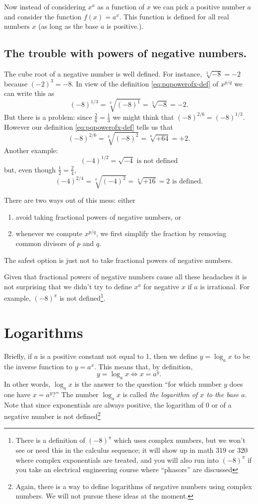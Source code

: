 Now instead of considering $x^a$ as a function of $x$ we can pick a positive
number $a$ and consider the function $f(x) = a^x$. This function is defined for
all real numbers $x$ (as long as the base $a$ is positive.).




\subsection{The trouble with powers of negative numbers. } %
The cube root of a negative number is well defined.  For instance,
$\sqrt[3]{-8}=-2$ because $(-2)^3 = -8$.  In view of the definition
\eqref{eq:pqpowerofx-def} of $x^{p/q}$ we can write this as
\[
(-8)^{1/3} = \sqrt[3]{(-8)^1} = \sqrt[3]{-8} = -2.
\]
But there is a problem: since $\frac{2}{6}=\frac13$ we might think that
$(-8)^{2/6} = (-8)^{1/3}$.  However our definition \eqref{eq:pqpowerofx-def}
tells us that
\[
(-8)^{2/6} = \sqrt[6]{(-8)^2} = \sqrt[6]{+64} =  +2.
\]
Another example:
\[
(-4)^{1/2} = \sqrt{-4} \text{ is not defined}
\]
but, even though $\frac12=\frac24$,
\[
(-4)^{2/4} = \sqrt[4]{(-4)^2}  = \sqrt[4]{+16} = 2 \text{ is defined.}
\]

There are two ways out of this mess: either
\begin{enumerate}\sffamily\itshape
\item avoid taking fractional powers of negative numbers, or
\item whenever we compute $x^{p/q}$, we first simplify the fraction by removing
  common divisors of $p$ and $q$.
\end{enumerate}
The safest option is just not to take fractional powers of negative numbers.




Given that fractional powers of negative numbers cause all these
headaches it is not surprising that we didn't try to define $x^a$ for
negative $x$ if $a$ is irrational.  For example, $(-8)^\pi$ is not
defined\footnote{There is a definition of $(-8)^\pi$ which uses complex
numbers, but we won't see or need this in the calculus sequence; it
will show up in math 319 or 320 where complex exponentials are
treated, and you will also run into $(-8)^\pi$ if you take an
electrical engineering course where ``phasors'' are discussed}.



\section{Logarithms} %
Briefly, if $a$ is a positive constant not equal to 1, then we define $y=\log_a
x$ to be the inverse function to $y=a^x$. This means that, by definition,
\[
y=\log_a x \iff x=a^y.
\]
In other words, $\log_a x$ is the answer to the question ``for which number $y$
does one have $x=a^y$?''  The number $\log_a x$ is called \emph{the logarithm of
$x$ to the base $a$}.  Note that since exponentials are always positive, the
logarithm of 0 or of a negative number is not defined\footnote{Again, there is a
way to define logarithms of negative numbers using complex numbers. We will not
pursue these ideas at the moment.}


